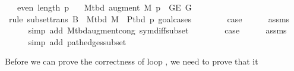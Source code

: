 \begin{isabellebody}
\ \ \ {\isachardoublequoteopen}even\ {\isacharparenleft}{\kern0pt}length\ p{\isacharparenright}{\kern0pt}{\isachardoublequoteclose}\isanewline
\ \ \ {\isachardoublequoteopen}M{\isacharunderscore}{\kern0pt}tbd\ {\isacharparenleft}{\kern0pt}augment\ M\ p{\isacharparenright}{\kern0pt}\ {\isasymsubseteq}\ G{\isachardot}{\kern0pt}E\ G{\isachardoublequoteclose}%
\endisataginvisible
{\isafoldinvisible}%
%
\isadeliminvisible
\isanewline
%
\endisadeliminvisible
%
\isadelimproof
%
\endisadelimproof
%
\isatagproof
{}\isamarkupfalse%
\ {\isacharparenleft}{\kern0pt}rule\ subset{\isacharunderscore}{\kern0pt}trans{\isacharbrackleft}{\kern0pt}\ {\isacharquery}{\kern0pt}B\ {\isacharequal}{\kern0pt}\ {\isachardoublequoteopen}M{\isacharunderscore}{\kern0pt}tbd\ M\ {\isasymunion}\ P{\isacharunderscore}{\kern0pt}tbd\ p{\isachardoublequoteclose}{\isacharbrackright}{\kern0pt}{\isacharcomma}{\kern0pt}\ goal{\isacharunderscore}{\kern0pt}cases{\isacharparenright}{\kern0pt}\isanewline
\ \ \isamarkupfalse%
\ {}\isanewline
\ \ \isamarkupfalse%
\ {\isacharquery}{\kern0pt}case\isanewline
\ \ \ \ \isamarkupfalse%
\ assms\isanewline
\ \ \ \ \isamarkupfalse%
\ {\isacharparenleft}{\kern0pt}simp\ add{\isacharcolon}{\kern0pt}\ M{\isacharunderscore}{\kern0pt}tbd{\isacharunderscore}{\kern0pt}augment{\isacharunderscore}{\kern0pt}cong\ sym{\isacharunderscore}{\kern0pt}diff{\isacharunderscore}{\kern0pt}subset{\isacharparenright}{\kern0pt}\isanewline
{}\isamarkupfalse%
\isanewline
\ \ \isamarkupfalse%
\ {}\isanewline
\ \ \isamarkupfalse%
\ {\isacharquery}{\kern0pt}case\isanewline
\ \ \ \ \isamarkupfalse%
\ assms{\isacharparenleft}{\kern0pt}{}{\isacharcomma}{\kern0pt}\ {}{\isacharparenright}{\kern0pt}\isanewline
\ \ \ \ \isamarkupfalse%
\ {\isacharparenleft}{\kern0pt}simp\ add{\isacharcolon}{\kern0pt}\ path{\isacharunderscore}{\kern0pt}edges{\isacharunderscore}{\kern0pt}subset{\isacharparenright}{\kern0pt}\isanewline
{}\isamarkupfalse%
%
\endisatagproof
{\isafoldproof}%
%
\isadelimproof
%
\endisadelimproof
%
\isadelimdocument
%
\endisadelimdocument
%
\isatagdocument
%
\isamarkuptrue%
%
\endisatagdocument
{\isafolddocument}%
%
\isadelimdocument
%
\endisadelimdocument
%
\begin{isamarkuptext}%
Before we can prove the correctness of loop , we need to prove that it

\end{isamarkuptext}
\end{isabellebody}
